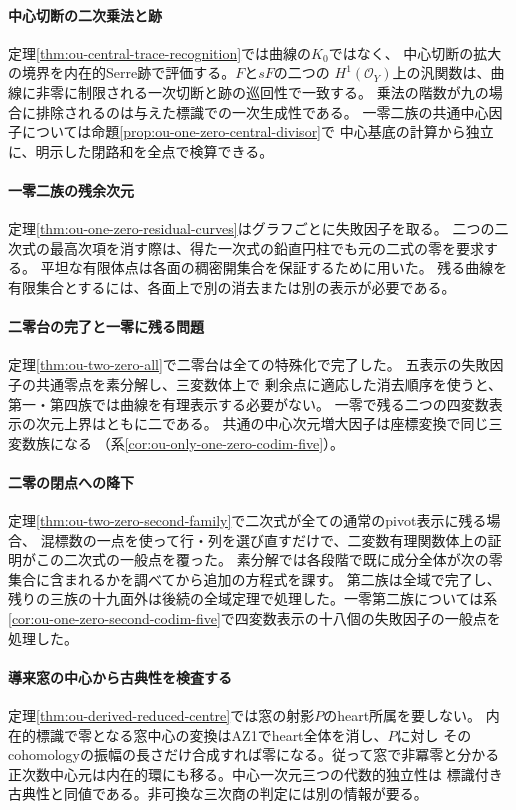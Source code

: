 \documentclass[11pt,a4paper]{ltjsarticle}
\begin{document}
\paragraph{中心切断の二次乗法と跡}
定理\ref{thm:ou-central-trace-recognition}では曲線の$K_0$ではなく、
中心切断の拡大の境界を内在的Serre跡で評価する。$F$と$sF$の二つの
$H^1(\mathcal O_Y)$上の汎関数は、曲線に非零に制限される一次切断と跡の巡回性で一致する。
乗法の階数が九の場合に排除されるのは与えた標識での一次生成性である。
一零二族の共通中心因子については命題\ref{prop:ou-one-zero-central-divisor}で
中心基底の計算から独立に、明示した閉路和を全点で検算できる。

\paragraph{一零二族の残余次元}
定理\ref{thm:ou-one-zero-residual-curves}はグラフごとに失敗因子を取る。
二つの二次式の最高次項を消す際は、得た一次式の鉛直円柱でも元の二式の零を要求する。
平坦な有限体点は各面の稠密開集合を保証するために用いた。
残る曲線を有限集合とするには、各面上で別の消去または別の表示が必要である。

\paragraph{二零台の完了と一零に残る問題}
定理\ref{thm:ou-two-zero-all}で二零台は全ての特殊化で完了した。
五表示の失敗因子の共通零点を素分解し、三変数体上で
剰余点に適応した消去順序を使うと、第一・第四族では曲線を有理表示する必要がない。
一零で残る二つの四変数表示の次元上界はともに二である。
共通の中心次元増大因子は座標変換で同じ三変数族になる
（系\ref{cor:ou-only-one-zero-codim-five}）。

\paragraph{二零の閉点への降下}
定理\ref{thm:ou-two-zero-second-family}で二次式が全ての通常のpivot表示に残る場合、
混標数の一点を使って行・列を選び直すだけで、二変数有理関数体上の証明がこの二次式の一般点を覆った。
素分解では各段階で既に成分全体が次の零集合に含まれるかを調べてから追加の方程式を課す。
第二族は全域で完了し、残りの三族の十九面外は後続の全域定理で処理した。一零第二族については系\ref{cor:ou-one-zero-second-codim-five}で四変数表示の十八個の失敗因子の一般点を処理した。

\paragraph{導来窓の中心から古典性を検査する}
定理\ref{thm:ou-derived-reduced-centre}では窓の射影$P$のheart所属を要しない。
内在的標識で零となる窓中心の変換はAZ1でheart全体を消し、$P$に対し
そのcohomologyの振幅の長さだけ合成すれば零になる。従って窓で非冪零と分かる
正次数中心元は内在的環にも移る。中心一次元三つの代数的独立性は
標識付き古典性と同値である。非可換な三次商の判定には別の情報が要る。
\end{document}
